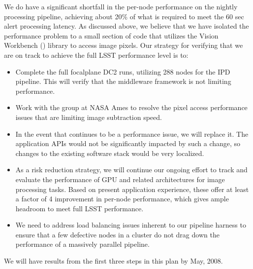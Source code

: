 We do have a significant shortfall in the per-node performance on the nightly processing pipeline, achieving about 20\% of what is required to meet the 60 sec alert processing latency.  As discussed above, we believe that we have isolated the performance problem to a small section of code that utilizes the Vision Workbench () library to access image pixels. Our strategy for verifying that we are on track to achieve the full LSST performance level is to:

\begin{itemize} 

\item Complete the full focalplane DC2 runs, utilizing 288 nodes for the IPD pipeline.  This will verify that the middleware framework is not limiting performance. 

\item Work with the  group at NASA Ames to resolve the pixel access performance issues that are limiting image subtraction speed. 

\item In the event that  continues to be a performance issue, we will replace it.  The application APIs would not be significantly impacted by such a change, so changes to the existing software stack would be very localized. 

\item As a risk reduction strategy, we will continue our ongoing effort to track and evaluate the performance of GPU and related architectures for image processing tasks.  Based on present application experience, these offer at least a factor of 4 improvement in per-node performance, which gives ample headroom to meet full LSST performance. 

\item We need to address load balancing issues inherent to our pipeline harness to ensure that a few defective nodes in a cluster do not drag down the performance of a massively parallel pipeline.   

\end{itemize}

We will have results from the first three steps in this plan by May, 2008.
